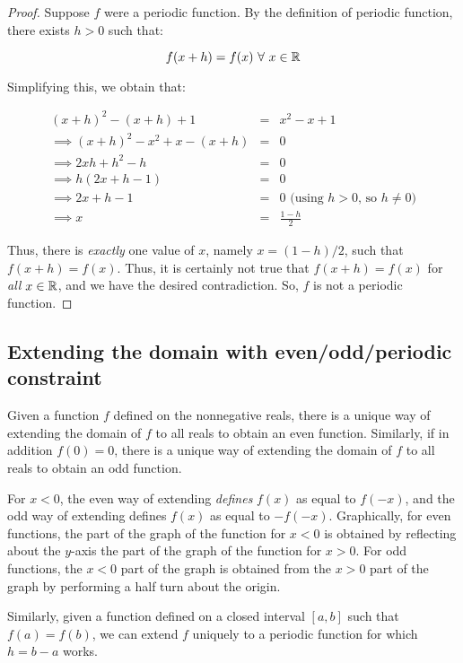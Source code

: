 \documentclass{amsart}
\begin{document}
\begin{proof}
  Suppose $f$ were a periodic function. By the definition of periodic
  function, there exists $h > 0$ such that:

  \begin{equation*}
    f(x + h) = f(x) \ \forall \ x \in \mathbb{R}
  \end{equation*}

  Simplifying this, we obtain that:

  \begin{eqnarray*}
    (x + h)^2 - (x + h) + 1 & = & x^2 - x + 1 \\
    \implies (x + h)^2 - x^2 + x - (x + h) & = & 0 \\
    \implies 2xh + h^2 - h & = & 0 \\
    \implies h(2x + h - 1) & = & 0 \\
    \implies 2x + h - 1  & = & 0 \text{ (using $h > 0$, so $h \ne 0$)}\\
    \implies x & = & \frac{1 - h}{2}
  \end{eqnarray*}

  Thus, there is {\em exactly} one value of $x$, namely $x = (1 -
  h)/2$, such that $f(x + h) = f(x)$. Thus, it is certainly not true
  that $f(x + h) = f(x)$ for {\em all} $x \in \mathbb{R}$, and we have the desired
  contradiction. So, $f$ is not a periodic function.
\end{proof}

\subsection{Extending the domain with even/odd/periodic constraint}

Given a function $f$ defined on the nonnegative reals, there is a
unique way of extending the domain of $f$ to all reals to obtain an
even function. Similarly, if in addition $f(0) = 0$, there is a unique
way of extending the domain of $f$ to all reals to obtain an odd
function.

For $x < 0$, the even way of extending {\em defines} $f(x)$ as equal
to $f(-x)$, and the odd way of extending defines $f(x)$ as equal to
$-f(-x)$. Graphically, for even functions, the part of the graph of
the function for $x < 0$ is obtained by reflecting about the $y$-axis
the part of the graph of the function for $x > 0$. For odd functions,
the $x < 0$ part of the graph is obtained from the $x > 0$ part of the
graph by performing a half turn about the origin.

Similarly, given a function defined on a closed interval $[a,b]$ such
that $f(a) = f(b)$, we can extend $f$ uniquely to a periodic function
for which $h = b - a$ works.
\end{document}
